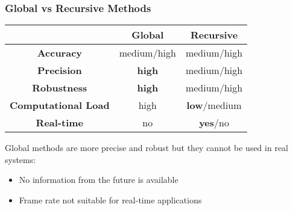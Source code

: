 \begin{frame}
	\frametitle{Global vs Recursive Methods}
	
	\Large
	
	\vspace{0.1cm}
	
	\begin{table}[!t]
		\centering
		\begin{tabular}{ c | c | c | }
			\cline{2-3}
			& \textbf{Global} & \textbf{Recursive} \\ \hline
			
			\multicolumn{1}{|c|}{\textbf{Accuracy}} & medium/high & medium/high \\ \hline
			\multicolumn{1}{|c|}{\textbf{Precision}} & \textbf{high} & medium/high \\ \hline
			\multicolumn{1}{|c|}{\textbf{Robustness}} & \textbf{high} & medium/high \\ \hline
			\multicolumn{1}{|c|}{\textbf{Computational Load}} & high & \textbf{low}/medium \\ \hline
			\multicolumn{1}{|c|}{\textbf{Real-time}} & no & \textbf{yes}/no \\ \hline
		\end{tabular}
	\end{table}
	
	\vspace{0.15cm}
	
	Global methods are more precise and robust but they cannot be used in real systems:
	\begin{itemize}
		\item No information from the future is available
		\vspace{-0.1cm}
		\item Frame rate not suitable for real-time applications
	\end{itemize}
\end{frame}
